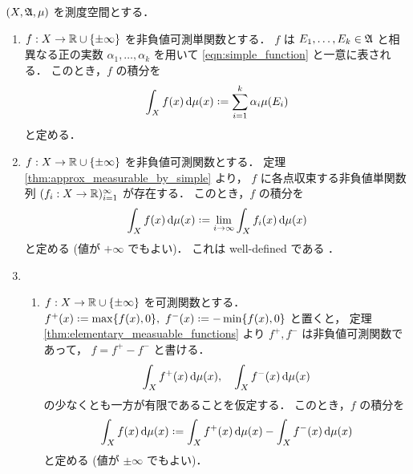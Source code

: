 \begin{definition}\label{def:Lebesgue_integral}
    $(X,\mathfrak{A},\mu)$ を測度空間とする．
    \begin{enumerate}
        \item $f:X\to\mathbb{R}\cup\{\pm\infty\}$ を非負値可測単関数とする．
            $f$ は $E_1,\ldots,E_k\in\mathfrak{A}$ と相異なる正の実数 $\alpha_1,\ldots,\alpha_k$ を用いて
            \eqref{eqn:simple_function} と一意に表される．
            このとき，$f$ の積分を
            \begin{align*}
                \int_Xf(x)\,\drm\mu(x)\defeq\sum_{i=1}^k\alpha_i\mu(E_i)
            \end{align*}
            と定める．
        \item $f:X\to\mathbb{R}\cup\{\pm\infty\}$ を非負値可測関数とする．
            定理 \ref{thm:approx_measurable_by_simple} より，
            $f$ に各点収束する非負値単関数列 $(f_i:X\to\mathbb{R})_{i=1}^\infty$ が存在する．
            このとき，$f$ の積分を
            \begin{align*}
                \int_Xf(x)\,\drm\mu(x)\defeq\lim_{i\to\infty}\int_Xf_i(x)\,\drm\mu(x)
            \end{align*}
            と定める (値が $+\infty$ でもよい)．
            これは well-defined である \cite[pp.74--77]{It63}．
        \item
            \begin{enumerate}
                \item
                    $f:X\to\mathbb{R}\cup\{\pm\infty\}$ を可測関数とする．
                    $f^+(x)\defeq\max\{f(x),0\},\ f^-(x)\defeq-\min\{f(x),0\}$ と置くと，
                    定理 \ref{thm:elementary_measuable_functions} より $f^+,f^-$ は非負値可測関数であって，
                    $f=f^+-f^-$ と書ける．
                    \begin{align}
                        \int_Xf^+(x)\,\mathrm{d}\mu(x),\quad
                        \int_Xf^-(x)\,\mathrm{d}\mu(x)
                        \label{eqn:f_pm_integral}
                    \end{align}
                    の少なくとも一方が有限であることを仮定する．
                    このとき，$f$ の積分を
                    \begin{align}
                        \int_Xf(x)\,\drm\mu(x)\defeq\int_Xf^+(x)\,\drm\mu(x)-\int_Xf^-(x)\,\drm\mu(x)
                        \label{eqn:f_integral}
                    \end{align}
                    と定める (値が $\pm\infty$ でもよい)．

\end{enumerate}
\end{enumerate}
\end{definition}
